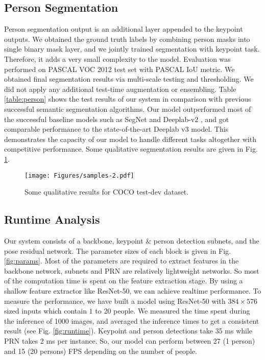 \documentclass[runningheads]{llncs}
\begin{document}
\subsection{Person Segmentation}
Person segmentation output is an additional layer appended to the keypoint outputs. We obtained the ground truth labels by combining person masks into single binary mask layer, and we jointly trained segmentation with keypoint task. Therefore, it adds a very small complexity to the model. Evaluation was performed on PASCAL VOC 2012 test set with PASCAL IoU metric. We obtained final segmentation results via multi-scale testing and thresholding. We did not apply any additional test-time augmentation or ensembling. Table \ref{table:person} shows the test results of our system in comparison with previous successful semantic segmentation algorithms. Our model outperformed most of the successful baseline models such as SegNet \cite{kendall2015bayesian} and Deeplab-v2 \cite{Chen2016}, and got comparable performance to the state-of-the-art Deeplab v3 \cite{Chen} model. This demonstrates the capacity of our model to handle different tasks altogether with competitive performance. Some qualitative segmentation results are given in Fig. \ref{fig:samples}.


\begin{figure}
\centering
\texttt{[image: Figures/samples-2.pdf]}
\caption{Some qualitative results for COCO test-dev dataset.}
\label{fig:samples}
\end{figure}


\subsection{Runtime Analysis}
Our system consists of a backbone, keypoint \& person detection subnets, and the pose residual network. The parameter sizes of each block is given in Fig. \ref{fig:params}. Most of the parameters are required to extract features in the backbone network, subnets and PRN are relatively lightweight networks. So most of the computation time is spent on the feature extraction stage. By using a shallow feature extractor like ResNet-50, we can achieve realtime performance. To measure the performance, we have built a model using ResNet-50 with $384 \times 576$ sized inputs which contain $1$ to $20$ people. We measured the time spent during the inference of 1000 images, and averaged the inference times to get a consistent result (see Fig. \ref{fig:runtime}). Keypoint and person detections take 35 ms while PRN takes 2 ms per instance. So, our model can perform between 27 (1 person) and 15 (20 persons) FPS depending on the number of people. 
\end{document}
